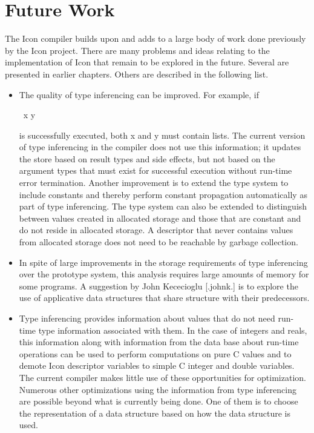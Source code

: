\section{Future Work}

The Icon compiler builds upon and adds to a large body of work done
previously by the Icon project. There are many problems and ideas
relating to the implementation of Icon that remain to be explored in
the future. Several are presented in earlier chapters. Others are
described in the following list.

\liststyleLxxxv
\begin{itemize}
\item 
The quality of type inferencing can be improved. For example, if 

{\ttfamily
\ x {\textbar}{\textbar}{\textbar} y}

\noindent is successfully executed, both x and y must contain
lists. The current version of type inferencing in the compiler does
not use this information; it updates the store based on result types
and side effects, but not based on the argument types that must exist
for successful execution without run-time error termination. Another
improvement is to extend the type system to include constants and
thereby perform constant propagation automatically as part of type
inferencing.  The type system can also be extended to distinguish
between values created in allocated storage and those that are
constant and do not reside in allocated storage. A descriptor that
never contains values from allocated storage does not need to be
reachable by garbage collection.

\item In spite of large improvements in the storage requirements of
type inferencing over the prototype system, this analysis requires
large amounts of memory for some programs. A suggestion by John
Kececioglu [.johnk.] is to explore the use of applicative data
structures that share structure with their predecessors.

\item Type inferencing provides information about values that do not
need run-time type information associated with them. In the case of
integers and reals, this information along with information from the
data base about run-time operations can be used to perform
computations on pure C values and to demote Icon descriptor variables
to simple C integer and double variables. The current compiler makes
little use of these opportunities for optimization. Numerous other
optimizations using the information from type inferencing are possible
beyond what is currently being done. One of them is to choose the
representation of a data structure based on how the data structure is used.


\end{itemize}
